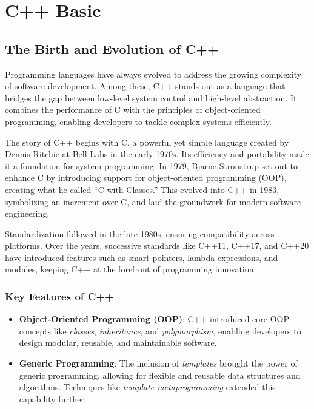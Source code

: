 
\chapter{C++ Basic}

\section{The Birth and Evolution of C++}

Programming languages have always evolved to address the growing complexity of software development. Among these, C++ stands out as a language that bridges the gap between low-level system control and high-level abstraction. It combines the performance of C with the principles of object-oriented programming, enabling developers to tackle complex systems efficiently.

The story of C++ begins with C, a powerful yet simple language created by Dennis Ritchie at Bell Labs in the early 1970s. Its efficiency and portability made it a foundation for system programming. In 1979, Bjarne Stroustrup set out to enhance C by introducing support for object-oriented programming (OOP), creating what he called “C with Classes.” This evolved into C++ in 1983, symbolizing an increment over C, and laid the groundwork for modern software engineering.

Standardization followed in the late 1980s, ensuring compatibility across platforms. Over the years, successive standards like C++11, C++17, and C++20 have introduced features such as smart pointers, lambda expressions, and modules, keeping C++ at the forefront of programming innovation.

\subsection{Key Features of C++}

\begin{itemize}
    \item \textbf{Object-Oriented Programming (OOP)}: 
    C++ introduced core OOP concepts like \textit{classes}, \textit{inheritance}, and \textit{polymorphism}, enabling developers to design modular, reusable, and maintainable software.
    
    \item \textbf{Generic Programming}: 
    The inclusion of \textit{templates} brought the power of generic programming, allowing for flexible and reusable data structures and algorithms. Techniques like \textit{template metaprogramming} extended this capability further.
\end{itemize}

